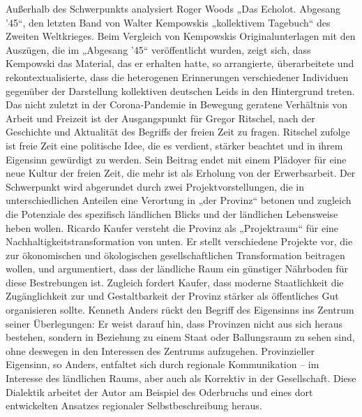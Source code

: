 \begin{multicols*}{2}
Außerhalb des Schwerpunkts analysiert Roger Woods „Das Echolot. Abgesang ’45“, den letzten Band von Walter Kempowskis „kollektivem Tagebuch“ des Zweiten Weltkrieges. Beim Vergleich von Kempowskis Originalunterlagen mit den Auszügen, die im „Abgesang ’45“ veröffentlicht wurden, zeigt sich, dass Kempowski das Material, das er erhalten hatte, so arrangierte, überarbeitete und rekontextualisierte, dass die heterogenen Erinnerungen verschiedener Individuen gegenüber der Darstellung kollektiven deutschen Leids in den Hintergrund treten. Das nicht zuletzt in der Corona-Pandemie in Bewegung geratene Verhältnis von Arbeit und Freizeit ist der Ausgangspunkt für Gregor Ritschel, nach der Geschichte und Aktualität des Begriffs der freien Zeit zu fragen. Ritschel zufolge ist freie Zeit eine politische Idee, die es verdient, stärker beachtet und in ihrem Eigensinn gewürdigt zu werden. Sein Beitrag endet mit einem Plädoyer für eine neue Kultur der freien Zeit, die mehr ist als Erholung von der Erwerbsarbeit.
Der Schwerpunkt wird abgerundet durch zwei Projektvorstellungen, die in unterschiedlichen Anteilen eine Verortung in „der Provinz“ betonen und zugleich die Potenziale des spezifisch ländlichen Blicks und der ländlichen Lebensweise heben wollen. Ricardo Kaufer versteht die Provinz als „Projektraum“ für eine Nachhaltigkeitstransformation von unten. Er stellt verschiedene Projekte vor, die zur ökonomischen und ökologischen gesellschaftlichen Transformation beitragen wollen, und argumentiert, dass der ländliche Raum ein günstiger Nährboden für diese Bestrebungen ist. Zugleich fordert Kaufer, dass moderne Staatlichkeit die Zugänglichkeit zur und Gestaltbarkeit der Provinz stärker als öffentliches Gut organisieren sollte. Kenneth Anders rückt den Begriff des Eigensinns ins Zentrum seiner Überlegungen: Er weist darauf hin, dass Provinzen nicht aus sich heraus bestehen, sondern in Beziehung zu einem Staat oder Ballungsraum zu sehen sind, ohne deswegen in den Interessen des Zentrums aufzugehen. Provinzieller Eigensinn, so Anders, entfaltet sich durch regionale Kommunikation – im Interesse des ländlichen Raums, aber auch als Korrektiv in der Gesellschaft. Diese Dialektik arbeitet der Autor am Beispiel des Oderbruchs und eines dort entwickelten Ansatzes regionaler Selbstbeschreibung heraus.


\end{multicols*}
